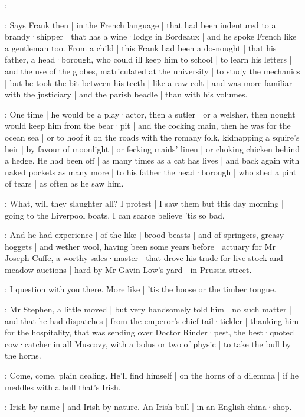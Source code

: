 \punch:

:
Says Frank then |
in the French language |
that had been indentured to a brandy·shipper |
that has a wine·lodge in Bordeaux |
and he spoke French like a gentleman too.
From a child |
this Frank had been a do-nought |
that his father,
a head·borough,
who could ill keep him to school |
to learn his letters |
and the use of the globes,
matriculated at the university |
to study the mechanics |
but he took the bit between his teeth |
like a raw colt |
and was more familiar |
with the justiciary |
and the parish beadle |
than with his volumes.

:
One time |
he would be a play·actor,
then a sutler |
or a welsher,
then nought would keep him from the bear·pit |
and the cocking main,
then he was for the ocean sea |
or to hoof it on the roads with the romany folk,
kidnapping a squire's heir |
by favour of moonlight |
or fecking maids' linen |
or choking chicken behind a hedge.
He had been off |
as many times as a cat has lives |
and back again with naked pockets as many more |
to his father the head·borough |
who shed a pint of tears |
as often as he saw him.

\Bloom:
What,
will they slaughter all?
I protest |
I saw them but this day morning |
going to the Liverpool boats.
I can scarce believe 'tis so bad.

:
And he had experience |
of the like |
brood beasts |
and of springers,
greasy hoggets |
and wether wool,
having been some years before |
actuary for Mr Joseph Cuffe,
a worthy sales·master |
that drove his trade for live stock and meadow auctions |
hard by Mr Gavin Low's yard |
in Prussia street.

\Bloom:
I question with you there.
More like |
'tis the hoose or the timber tongue.

:
Mr Stephen,
a little moved |
but very handsomely told him |
no such matter |
and that he had dispatches |
from the emperor's chief tail·tickler |
thanking him for the hospitality,
that was sending over Doctor Rinder·pest,
the best·quoted cow·catcher in all Muscovy,
with a bolus or two of physic |
to take the bull by the horns.

\lynch:
Come,
come,
plain dealing.
He'll find himself |
on the horns of a dilemma |
if he meddles with a bull that's Irish.

\stephen:
Irish by name |
and Irish by nature.
An Irish bull |
in an English china·shop.


